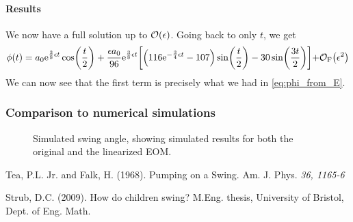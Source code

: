 \documentclass[11pt,letter, swedish, english,%
]{article}
\begin{document}
\paragraph{Results}
We now have a full solution up to $\order{\epsilon}$.
Going back to only $t$, we get
\begin{equation}
\phi(t)=a_0\mathrm{e}^{\frac{3}{8}\epsilon{t}}\cos(\frac{t}{2})
+\frac{\epsilon a_0}{96}\mathrm{e}^{\frac{3}{8}\epsilon{t}}\qty[
\qty(116\mathrm{e}^{-\frac{3}{4}\epsilon{t}}-107)
\sin(\frac{t}{2})
-30\sin(\frac{3t}{2})]
{+}\mathcal{O}_\text{F}\qty(\epsilon^2)
\end{equation}
We can now see that the first term is precisely what we had in
\eqref{eq:phi_from_E}. 



\subsubsection{Comparison to numerical simulations}


\begin{figure}\centering
\caption{Simulated swing angle, showing simulated results for both the
  original and the linearized EOM.
}
\label{fig:sim}
\end{figure}



\begin{thebibliography}{9}

Tea, P.L. Jr. and Falk, H. (1968). Pumping on a Swing. Am. J. Phys. 
\textit{36, 1165-6}

Strub, D.C. (2009). How do children swing?  M.Eng. thesis, University
of Bristol, Dept. of Eng. Math.%

\end{thebibliography}
\end{document}
